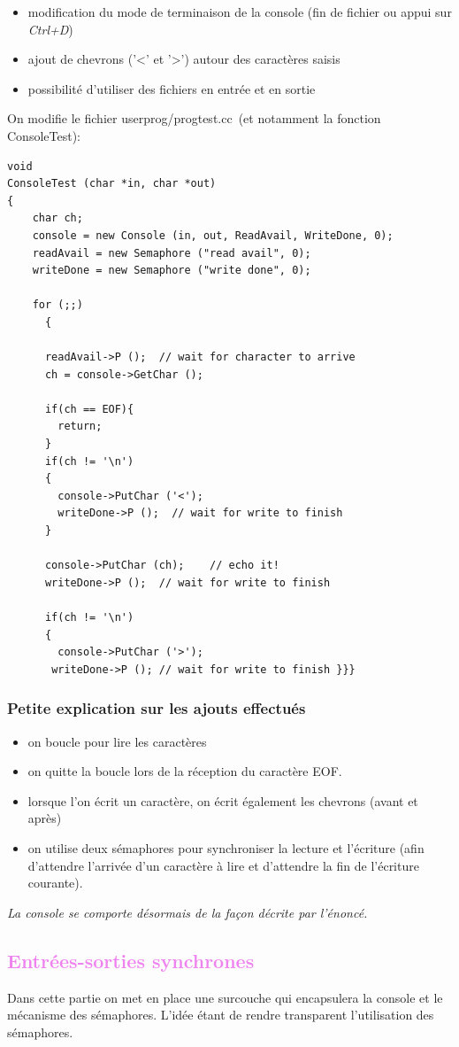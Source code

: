 \documentclass[a4paper,10pt]{article}
\begin{document}
 \begin{itemize}
  \item modification du mode de terminaison de la console (fin de fichier ou appui sur \emph{Ctrl+D})
  \item ajout de chevrons ('<' et '>') autour des caractères saisis
  \item possibilité d'utiliser des fichiers en entrée et en sortie
 \end{itemize}
On modifie le fichier userprog/progtest.cc (et notamment la fonction ConsoleTest):
\begin{lstlisting}
void
ConsoleTest (char *in, char *out)
{
    char ch;
    console = new Console (in, out, ReadAvail, WriteDone, 0);
    readAvail = new Semaphore ("read avail", 0);
    writeDone = new Semaphore ("write done", 0);

    for (;;)
      {

	  readAvail->P ();	// wait for character to arrive
	  ch = console->GetChar ();

      if(ch == EOF){
        return;
      }
      if(ch != '\n')
      {
        console->PutChar ('<');
        writeDone->P ();  // wait for write to finish
      }

	  console->PutChar (ch);	// echo it!
      writeDone->P ();  // wait for write to finish

      if(ch != '\n')
      {
        console->PutChar ('>');
	   writeDone->P ();	// wait for write to finish }}}
\end{lstlisting}
  \textcolor{TealBlue}{\subsubsection*{Petite explication sur les ajouts effectués}}
\begin{itemize}
 \item on boucle pour lire les caractères
 \item on quitte la boucle lors de la réception du caractère EOF.
 \item lorsque l'on écrit un caractère, on écrit également les chevrons (avant et après)
 \item on utilise deux sémaphores pour synchroniser la lecture et l'écriture 
 (afin d'attendre l'arrivée d'un caractère à lire et d'attendre la fin de l'écriture courante).
\end{itemize}
\emph{La console se comporte désormais de la façon décrite par l'énoncé.}

\textcolor{Violet}{\section{Entrées-sorties synchrones}}
  Dans cette partie on met en place une surcouche qui encapsulera la console et le mécanisme des sémaphores. L'idée étant de rendre transparent l'utilisation 
  des sémaphores.
  
\end{document}

